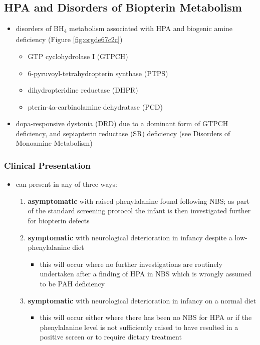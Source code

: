 \documentclass[12pt]{scrartcl}
\begin{document}
\subsection{HPA and Disorders of Biopterin Metabolism}
\label{sec:org033387a}
\begin{itemize}
\item disorders of BH\textsubscript{4} metabolism associated with HPA and biogenic amine deficiency (Figure \ref{fig:orgde67c2c})
\begin{itemize}
\item GTP cyclohydrolase I (GTPCH)
\item 6-pyruvoyl-tetrahydropterin synthase (PTPS)
\item dihydropteridine reductase (DHPR)
\item pterin-4a-carbinolamine dehydratase (PCD)
\end{itemize}
\item dopa-responsive dystonia (DRD) due to a dominant form of GTPCH
deficiency, and sepiapterin reductase (SR) deficiency (see Disorders of Monoamine Metabolism)
\end{itemize}
\subsubsection{Clinical Presentation}
\label{sec:orgbd6c33c}
\begin{itemize}
\item can present in any of three ways:
\begin{enumerate}
\item \textbf{asymptomatic} with raised phenylalanine found following NBS; as part of
the standard screening protocol the infant is then investigated
further for biopterin defects
\item \textbf{symptomatic} with neurological deterioration in infancy despite a
low-phenylalanine diet
\begin{itemize}
\item this will occur where no further investigations are routinely
undertaken after a finding of HPA in NBS which is wrongly
assumed to be PAH deficiency
\end{itemize}
\item \textbf{symptomatic} with neurological deterioration in infancy on a
normal diet
\begin{itemize}
\item this will occur either where there has been no NBS for HPA or
if the phenylalanine level is not sufficiently raised to have
resulted in a positive screen or to require dietary treatment
\end{itemize}
\end{enumerate}
\end{itemize}
\end{document}
